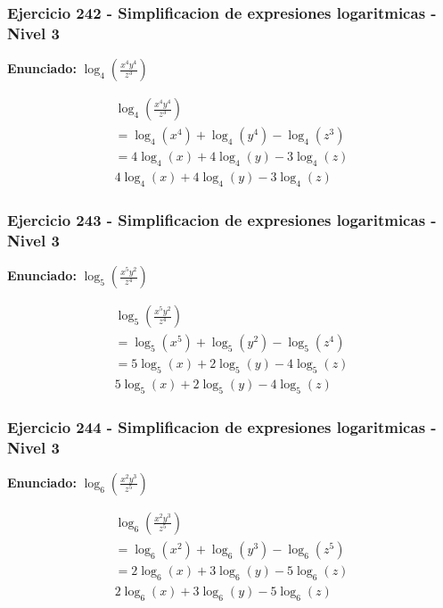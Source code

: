 \documentclass[12pt,a4paper]{article}
\begin{document}
\subsubsection*{Ejercicio 242 - Simplificacion de expresiones logaritmicas - Nivel 3}
\textbf{Enunciado:} \(\log_{4}\left(\frac{x^{4}y^{4}}{z^{3}}\right)\)

\[
\begin{aligned}
\log_{4}\left(\frac{x^{4}y^{4}}{z^{3}}\right)\\
=\log_{4}\left(x^{4}\right)+\log_{4}\left(y^{4}\right)-\log_{4}\left(z^{3}\right)\\
=4\log_{4}\left(x\right)+4\log_{4}\left(y\right)-3\log_{4}\left(z\right)\\
\boxed{4\log_{4}\left(x\right)+4\log_{4}\left(y\right)-3\log_{4}\left(z\right)}
\end{aligned}
\]


\subsubsection*{Ejercicio 243 - Simplificacion de expresiones logaritmicas - Nivel 3}
\textbf{Enunciado:} \(\log_{5}\left(\frac{x^{5}y^{2}}{z^{4}}\right)\)

\[
\begin{aligned}
\log_{5}\left(\frac{x^{5}y^{2}}{z^{4}}\right)\\
=\log_{5}\left(x^{5}\right)+\log_{5}\left(y^{2}\right)-\log_{5}\left(z^{4}\right)\\
=5\log_{5}\left(x\right)+2\log_{5}\left(y\right)-4\log_{5}\left(z\right)\\
\boxed{5\log_{5}\left(x\right)+2\log_{5}\left(y\right)-4\log_{5}\left(z\right)}
\end{aligned}
\]


\subsubsection*{Ejercicio 244 - Simplificacion de expresiones logaritmicas - Nivel 3}
\textbf{Enunciado:} \(\log_{6}\left(\frac{x^{2}y^{3}}{z^{5}}\right)\)

\[
\begin{aligned}
\log_{6}\left(\frac{x^{2}y^{3}}{z^{5}}\right)\\
=\log_{6}\left(x^{2}\right)+\log_{6}\left(y^{3}\right)-\log_{6}\left(z^{5}\right)\\
=2\log_{6}\left(x\right)+3\log_{6}\left(y\right)-5\log_{6}\left(z\right)\\
\boxed{2\log_{6}\left(x\right)+3\log_{6}\left(y\right)-5\log_{6}\left(z\right)}
\end{aligned}
\]
\end{document}
